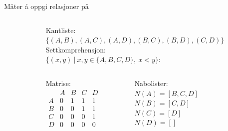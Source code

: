 \begin{frame}[fragile]{Måter å oppgi relasjoner på}
    \begin{columns}
        \begin{column}{0.3\textwidth}
        \end{column}
        \begin{column}{0.65\textwidth}
            \pause
            Kantliste:\\
            $\{(A, B), (A, C), (A, D), (B, C), (B, D), (C, D)\}$\\[5mm]
            \pause
            Settkomprehensjon:\\
            $\{(x, y) ~ | ~ x, y \in \{A,B,C,D\}, ~ x < y\}$:\\[5mm]
            \pause
            \begin{columns}
                \begin{column}{0.27\textwidth}
                    Matrise:\\
                    \begin{math}
                        \begin{matrix}
                              & A & B & C & D\\
                            A & 0 & 1 & 1 & 1\\
                            B & 0 & 0 & 1 & 1\\
                            C & 0 & 0 & 0 & 1\\
                            D & 0 & 0 & 0 & 0
                        \end{matrix}
                    \end{math}
                \end{column}
                \pause
                \begin{column}{0.38\textwidth}
                    Nabolister:\\        
                    $N(A) = [B, C, D]$\\
                    $N(B) = [C, D]$\\
                    $N(C) = [D]$\\
                    $N(D) = []$
                \end{column} 
                \begin{column}{0.1\textwidth}
                \end{column}
            \end{columns}
        \end{column}
    \end{columns}
\end{frame}





